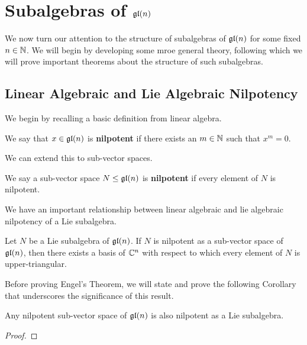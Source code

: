 \section{Subalgebras of $\mathfrak{gl}\!\left( n \right)$}

We now turn our attention to the structure of subalgebras of $\mathfrak{gl}\!\left( n \right)$ for some fixed $n \in \mathbb{N}$. We will begin by developing some mroe general theory, following which we will prove important theorems about the structure of such subalgebras.

\subsection{Linear Algebraic and Lie Algebraic Nilpotency}

We begin by recalling a basic definition from linear algebra.

\begin{boxdefinition}
    We say that $x \in \mathfrak{gl}\!\left( n \right)$ is \textbf{nilpotent} if there exists an $m \in \mathbb{N}$ such that $x^m = 0$. 
\end{boxdefinition}

We can extend this to sub-vector spaces.

\begin{boxdefinition}
    We say a sub-vector space $N \leq \mathfrak{gl}\!\left( n \right)$ is \textbf{nilpotent} if every element of $N$ is nilpotent.
\end{boxdefinition}

We have an important relationship between linear algebraic and lie algebraic nilpotency of a Lie subalgebra.

\begin{boxtheorem}\label{Ch1:Thm:Engel}
    Let $N$ be a Lie subalgebra of $\mathfrak{gl}\!\left( n \right)$. If $N$ is nilpotent as a sub-vector space of $\mathfrak{gl}\!\left( n \right)$, then there exists a basis of $\mathbb{C}^n$ with respect to which every element of $N$ is upper-triangular.
\end{boxtheorem}

Before proving Engel's Theorem, we will state and prove the following Corollary that underscores the significance of this result.

\begin{boxcorollary}\label{Ch1:Cor:EngelNilpotency}
    Any nilpotent sub-vector space of $\mathfrak{gl}\!\left( n \right)$ is also nilpotent as a Lie subalgebra.
\end{boxcorollary}
\begin{proof}
    \sorry
\end{proof}

